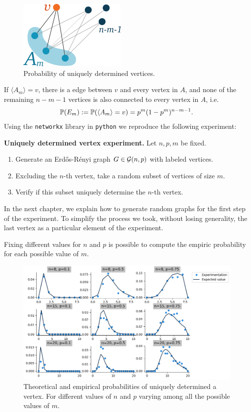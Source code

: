 \begin{figure}[h!]
	\centering
	\includegraphics[scale=1]{Figures/uni.png}
	\caption{Probability of uniquely determined vertices.}
\end{figure}

If $\langle A_{m} \rangle = v$, there is a edge between $v$ and every vertex in $A$, and none of the remaining $n-m-1$ vertices is also connected to every vertex in $A$, i.e.
$$\P (E_m) := \P(\langle A_{m}\rangle = v) = p^{m}(1-p^{m})^{n-m-1}.$$
Using the \texttt{networkx} library in \texttt{python} we reproduce the following experiment:

\begin{cajita}
\textbf{Uniquely determined vertex experiment.} Let $n,p,m$ be fixed.
\begin{enumerate}
\item Generate an Erdős-Rényi graph $G\in \G(n,p)$ with labeled vertices.
\item Excluding the $n$-th vertex, take a random subset of vertices of size $m$.
\item Verify if this subset uniquely determine the $n$-th vertex.
\end{enumerate}
\end{cajita}

In the next chapter, we explain how to generate random graphs for the first step of the experiment. To simplify the process we took, without losing generality, the last vertex as a particular element of the experiment.

Fixing different values for $n$ and $p$ is possible to compute the empiric probability for each possible value of $m$.

\begin{figure}[h!]\label{figureExp1}
	\centering
	\includegraphics[scale=0.55]{Python/Figures/Uniquely-determinated-fixed-vertex.png}
	\caption{Theoretical and empirical probabilities of uniquely determined a vertex. For different values of $n$ and $p$ varying among all the possible values of $m$.}
\end{figure}

